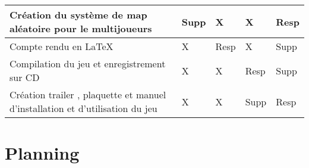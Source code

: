 \documentclass[titlepage, 13px, a4paper]{article}
\begin{document}
{\begin{tabular}{|p{6cm}|p{1.2cm}|p{1.2cm}|p{1.2cm}|p{1.2cm}|}
		\hline
		Création du système de map aléatoire pour le multijoueurs & Supp\footnotemark[2] & X & X & Resp\footnotemark[1] \\
		\hline
		Compte rendu en \LaTeX & X & Resp\footnotemark[1] & X & Supp\footnotemark[2]  \\
		\hline
		Compilation du jeu et enregistrement sur CD & X & X & Resp\footnotemark[1] & Supp\footnotemark[2] \\
		\hline
		Création trailer , plaquette et manuel d'installation et d'utilisation du jeu & X & X & Supp\footnotemark[2] & Resp\footnotemark[1] \\
		\hline
	\end{tabular}
	\label{repartition}		
}

\newpage
\section{Planning}
\end{document}
